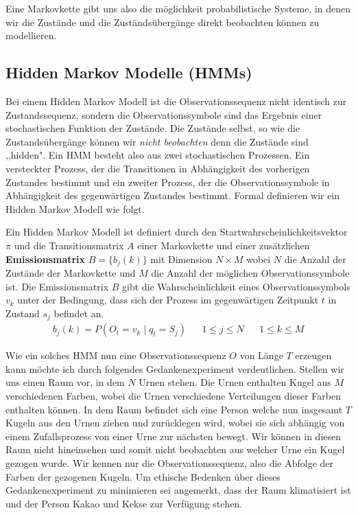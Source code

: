 Eine Markovkette gibt uns also die möglichkeit probabilistische Systeme, in denen wir die Zustände und die Zuständsübergänge direkt beobachten können zu modellieren.

\subsection{Hidden Markov Modelle (HMMs)}
Bei einem Hidden Markov Modell ist die Observationssequenz nicht identisch zur Zustandssequenz, sondern die Observationssymbole sind das Ergebnis einer stochastischen Funktion der Zustände. Die Zustände selbst, so wie die Zustandsübergänge können wir \textit{nicht beobachten} denn die Zustände sind ,,hidden". Ein HMM besteht also aus zwei stochastischen Prozessen. Ein versteckter Prozess, der die Transitionen in Abhängigkeit des vorherigen Zustandes bestimmt und ein zweiter Prozess, der die Observationssymbole in Abhängigkeit des gegenwärtigen Zustandes bestimmt.
Formal definieren wir ein Hidden Markov Modell wie folgt.
\begin{definition}
    Ein Hidden Markov Modell ist definiert durch den Startwahrscheinlichkeitsvektor $\pi$ und die Transitionsmatrix $A$ einer Markovkette und einer zusätzlichen \textbf{Emissionsmatrix} $B=\{b_j(k)\}$ mit Dimension $N \times M$ wobei $N$ die Anzahl der Zustände der Markovkette und $M$ die Anzahl der möglichen Observationssymbole ist. Die Emissionsmatrix $B$ gibt die Wahrscheinlichkeit eines Observationssymbols $v_k$ unter der Bedingung, dass sich der Prozess im gegenwärtigen Zeitpunkt $t$ in Zustand $s_j$ befindet an.
    \begin{align}
        b_j(k) = P(O_t = v_k \mid q_t = S_j) && 1 \leq j \leq N && 1 \leq k \leq M
    \end{align}
\end{definition}
Wie ein solches HMM nun eine Observationssequenz $O$ von Länge $T$ erzeugen kann möchte ich durch folgendes Gedankenexperiment verdeutlichen.
Stellen wir uns einen Raum vor, in dem $N$ Urnen stehen. Die Urnen enthalten Kugel aus $M$ verschiedenen Farben, wobei die Urnen verschiedene Verteilungen dieser Farben enthalten können. In dem Raum befindet sich eine Person welche nun insgesamt $T$ Kugeln aus den Urnen ziehen und zurücklegen wird, wobei sie sich abhängig von einem Zufallsprozess von einer Urne zur nächsten bewegt. Wir können in diesen Raum nicht hineinsehen und somit nicht beobachten aus welcher Urne ein Kugel gezogen wurde. Wir kennen nur die Observationssequenz, also die Abfolge der Farben der gezogenen Kugeln. Um ethische Bedenken über dieses Gedankenexperiment zu minimieren sei angemerkt, dass der Raum klimatisiert ist und der Person Kakao und Kekse zur Verfügung stehen.
